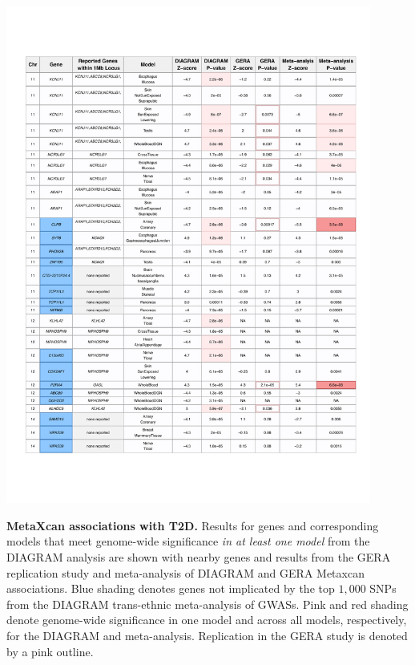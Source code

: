 \documentclass[10pt]{article}
\begin{document}
\clearpage
\begin{table}
\ContinuedFloat
	\includegraphics[width=0.90\textwidth]{supp_tab1_part4.pdf}
	\caption{\textbf{MetaXcan associations with T2D.} Results for genes and corresponding models that meet genome-wide significance \textit{in at least one model} from the DIAGRAM analysis are shown with nearby genes and results from the GERA replication study and meta-analysis of DIAGRAM and GERA Metaxcan associations. Blue shading denotes genes not implicated by the top $1,000$ SNPs from the DIAGRAM trans-ethnic meta-analysis of GWASs. Pink and red shading denote genome-wide significance in one model and across all models, respectively, for the DIAGRAM and meta-analysis. Replication in the GERA study is denoted by a pink outline.} 
	\label{tab:supp.table1.part4}
\end{table}
\end{document}
